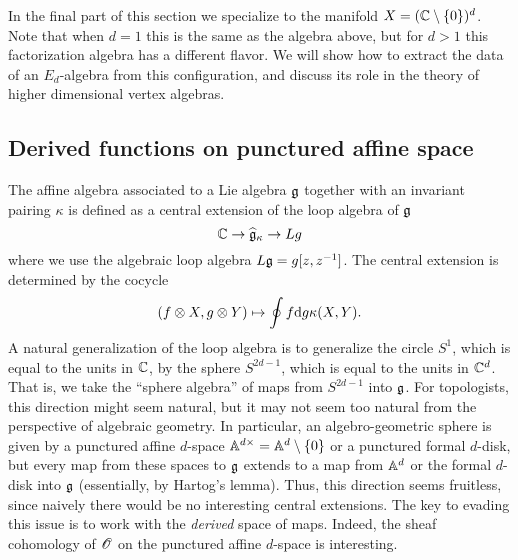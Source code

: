\documentclass[10pt]{amsart}
\begin{document}

In the final part of this section we specialize to the manifold $X = (\CC \setminus \{0\})^d$. 
Note that when $d=1$ this is the same as the algebra above, but for $d>1$ this factorization algebra has a different flavor. 
We will show how to extract the data of an $E_d$-algebra from this configuration, and discuss its role in the theory of higher dimensional vertex algebras. 



\subsection{Derived functions on punctured affine space}

The affine algebra associated to a Lie algebra $\fg$ together with an invariant pairing $\kappa$ is defined as a central extension of the loop algebra of $\fg$
\[
\CC \to \Hat{\fg}_{\kappa} \to Lg 
\]
where we use the algebraic loop algebra $L\fg = g [z,z^{-1}]$.
The central extension is determined by the cocycle 
\[
(f \tensor X, g \tensor Y) \mapsto \oint f \d g \kappa(X,Y) .
\] 
A natural generalization of the loop algebra is to generalize the circle $S^1$, which is equal to the units in $\CC$, by the sphere $S^{2d-1}$, which is equal to the units in $\CC^d$.
That is, we take the ``sphere algebra'' of maps from $S^{2d-1}$ into $\fg$.
For topologists, this direction might seem natural,
but it may not seem too natural from the perspective of algebraic geometry.
In particular, an algebro-geometric sphere is given by a punctured affine $d$-space $\AA^{d\times} = \AA^d \setminus \{0\}$ or a punctured formal $d$-disk,
but every map from these spaces to $\fg$ extends to a map from $\AA^d$ or the formal $d$-disk into $\fg$ (essentially, by Hartog's lemma).
Thus, this direction seems fruitless, since naively there would be no interesting central extensions.
The key to evading this issue is to work with the {\em derived} space of maps. 
Indeed, the sheaf cohomology of $\sO$ on the punctured affine $d$-space is interesting. 
\end{document}
